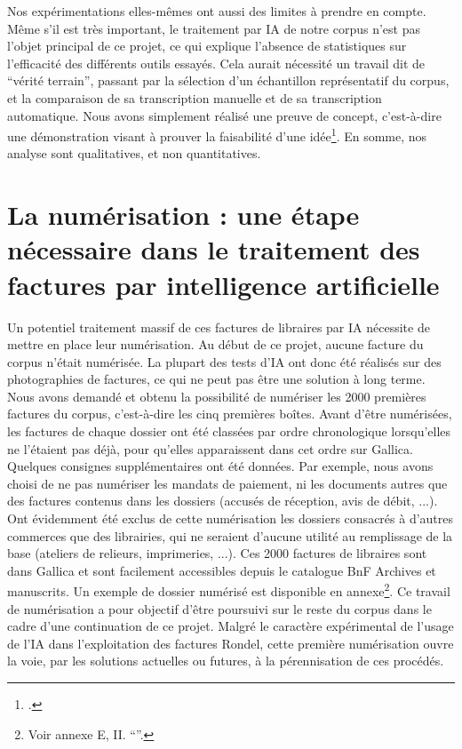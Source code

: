 Nos expérimentations elles-mêmes ont aussi des limites à prendre en compte. Même s'il est très important, le traitement par IA de notre corpus n'est pas l'objet principal de ce projet, ce qui explique l'absence de statistiques sur l'efficacité des différents outils essayés. Cela aurait nécessité un travail dit de \enquote{vérité terrain}, passant par la sélection d'un échantillon représentatif du corpus, et la comparaison de sa transcription manuelle et de sa transcription automatique. Nous avons simplement réalisé une preuve de concept, c'est-à-dire une démonstration visant à prouver la faisabilité d'une idée\footcite{definition_PoC}. En somme, nos analyse sont qualitatives, et non quantitatives. 



\section{La numérisation : une étape nécessaire dans le traitement des factures par intelligence artificielle} 

Un potentiel traitement massif de ces factures de libraires par IA nécessite de mettre en place leur numérisation. Au début de ce projet, aucune facture du corpus n'était numérisée. La plupart des tests d'IA ont donc été réalisés sur des photographies de factures, ce qui ne peut pas être une solution à long terme. Nous avons demandé et obtenu la possibilité de numériser les 2000 premières factures du corpus, c'est-à-dire les cinq premières boîtes. Avant d'être numérisées, les factures de chaque dossier ont été classées par ordre chronologique  lorsqu'elles ne l'étaient pas déjà, pour qu'elles apparaissent dans cet ordre sur Gallica. 
Quelques consignes supplémentaires ont été données. Par exemple, nous avons choisi de ne pas numériser les mandats de paiement, ni les documents autres que des factures contenus dans les dossiers (accusés de réception, avis de débit, ...). Ont évidemment été exclus de cette numérisation les dossiers consacrés à d'autres commerces que des librairies, qui ne seraient d'aucune utilité au remplissage de la base (ateliers de relieurs, imprimeries, ...). Ces 2000 factures de libraires sont dans Gallica et sont facilement accessibles depuis le catalogue BnF Archives et manuscrits. Un exemple de dossier numérisé est disponible en annexe\footnote{Voir annexe E, II. \enquote{}.}. Ce travail de numérisation a pour objectif d'être poursuivi sur le reste du corpus dans le cadre d'une continuation de ce projet. Malgré le caractère expérimental de l'usage de l'IA dans l'exploitation des factures Rondel, cette première numérisation ouvre la voie, par les solutions actuelles ou futures, à la pérennisation de ces procédés. 



